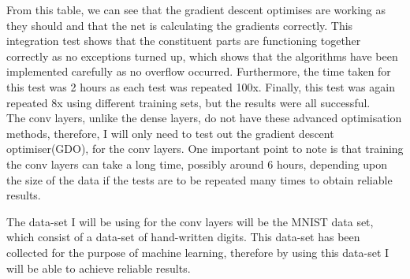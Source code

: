 From this table, we can see that the gradient descent optimises are working as they should and that the net is calculating the gradients correctly. This integration test shows that the constituent parts are functioning together correctly as no exceptions turned up, which shows that the algorithms have been implemented carefully as no overflow occurred. Furthermore, the time taken for this test was 2 hours as each test was repeated 100x. Finally, this test was again repeated 8x using different training sets, but the results were all successful.
\\
The conv layers, unlike the dense layers, do not have these advanced optimisation methods, therefore, I will only need to test out the gradient descent optimiser(GDO), for the conv layers. One important point to note is that training the conv layers can take a long time, possibly around 6 hours, depending upon the size of the data if the tests are to be repeated many times to obtain reliable results.

The data-set I will be using for the conv layers will be the MNIST data set, which consist of a data-set of hand-written digits. This data-set has been collected for the purpose of machine learning, therefore by using this data-set I will be able to achieve reliable results.

